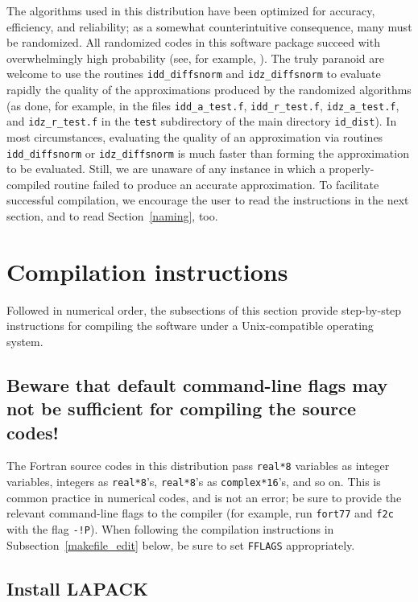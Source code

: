 \documentclass[letterpaper,12pt]{article}
\begin{document}
The algorithms used in this distribution have been optimized
for accuracy, efficiency, and reliability;
as a somewhat counterintuitive consequence, many must be randomized.
All randomized codes in this software package succeed
with overwhelmingly high probability (see, for example,
\cite{halko-martinsson-tropp}).
The truly paranoid are welcome to use the routines {\tt idd\_diffsnorm}
and {\tt idz\_diffsnorm} to evaluate rapidly the quality
of the approximations produced by the randomized algorithms
(as done, for example, in the files
{\tt idd\_a\_test.f}, {\tt idd\_r\_test.f}, {\tt idz\_a\_test.f},
and {\tt idz\_r\_test.f} in the {\tt test} subdirectory
of the main directory {\tt id\_dist}).
In most circumstances, evaluating the quality of an approximation
via routines {\tt idd\_diffsnorm} or {\tt idz\_diffsnorm} is much faster
than forming the approximation to be evaluated. Still, we are unaware
of any instance in which a properly-compiled routine failed to produce
an accurate approximation.
To facilitate successful compilation, we encourage the user
to read the instructions in the next section,
and to read Section~\ref{naming}, too.



\section{Compilation instructions}


Followed in numerical order, the subsections of this section
provide step-by-step instructions for compiling the software
under a Unix-compatible operating system.


\subsection{Beware that default command-line flags may not be
            sufficient for compiling the source codes!}
\label{warning}

The Fortran source codes in this distribution pass {\tt real*8}
variables as integer variables, integers as {\tt real*8}'s,
{\tt real*8}'s as {\tt complex*16}'s, and so on.
This is common practice in numerical codes, and is not an error;
be sure to provide the relevant command-line flags to the compiler
(for example, run {\tt fort77} and {\tt f2c} with the flag {\tt -!P}).
When following the compilation instructions
in Subsection~\ref{makefile_edit} below,
be sure to set {\tt FFLAGS} appropriately.


\subsection{Install LAPACK}
\end{document}
